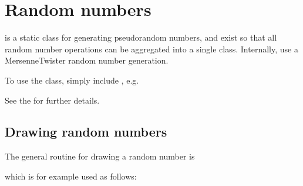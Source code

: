 \documentclass[letterpaper,10pt,english]{sphinxmanual}
\begin{document}
\section{Random numbers}
\label{\detokenize{Utilities/RandomNumbers:random-numbers}}\label{\detokenize{Utilities/RandomNumbers:chap-random}}\label{\detokenize{Utilities/RandomNumbers::doc}}
 is a static class for generating pseudo\sphinxhyphen{}random numbers, and exist so that all random number operations can be aggregated into a single class.
Internally,  use a Mersenne\sphinxhyphen{}Twister random number generation.

To use the  class, simply include , e.g.

\begin{sphinxVerbatim}[commandchars=\\\{\},formatcom=\scriptsize]
 
\end{sphinxVerbatim}

See the  for further details.


\subsection{Drawing random numbers}
\label{\detokenize{Utilities/RandomNumbers:drawing-random-numbers}}
The general routine for drawing a random number is

\begin{sphinxVerbatim}[commandchars=\\\{\},formatcom=\scriptsize]
 
  
\end{sphinxVerbatim}

which is for example used as follows:

\begin{sphinxVerbatim}[commandchars=\\\{\},formatcom=\scriptsize]
  

    
\end{sphinxVerbatim}
\end{document}

